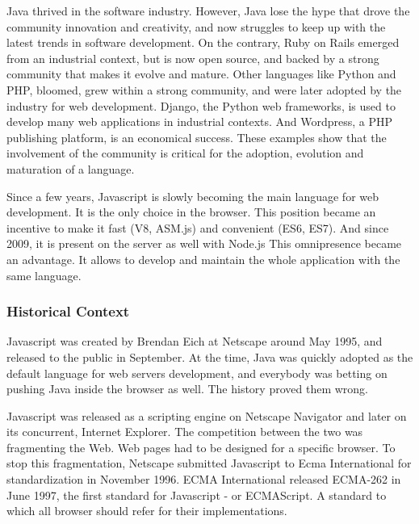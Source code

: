 Java thrived in the software industry.
However, Java lose the hype that drove the community innovation and creativity, and now struggles to keep up with the latest trends in software development.
On the contrary, Ruby on Rails emerged from an industrial context, but is now open source, and backed by a strong community that makes it evolve and mature.
Other languages like Python and PHP, bloomed, grew within a strong community, and were later adopted by the industry for web development.
Django, the Python web frameworks, is used to develop many web applications in industrial contexts.
And Wordpress, a PHP publishing platform, is an economical success.
These examples show that the involvement of the community is critical for the adoption, evolution and maturation of a language.

Since a few years, Javascript is slowly becoming the main language for web development.
It is the only choice in the browser.
This position became an incentive to make it fast (V8, ASM.js) and convenient (ES6, ES7).
And since 2009, it is present on the server as well with Node.js
This omnipresence became an advantage.
It allows to develop and maintain the whole application with the same language.

\subsubsection{Historical Context}


Javascript was created by Brendan Eich at Netscape around May 1995, and released to the public in September.
At the time, Java was quickly adopted as the default language for web servers development, and everybody was betting on pushing Java inside the browser as well.
The history proved them wrong.

Javascript was released as a scripting engine on Netscape Navigator and later on its concurrent, Internet Explorer.
The competition between the two was fragmenting the Web.
Web pages had to be designed for a specific browser.
To stop this fragmentation, Netscape submitted Javascript to Ecma International for standardization in November 1996.
ECMA International released ECMA-262 in June 1997, the first standard for Javascript - or ECMAScript.
A standard to which all browser should refer for their implementations.

